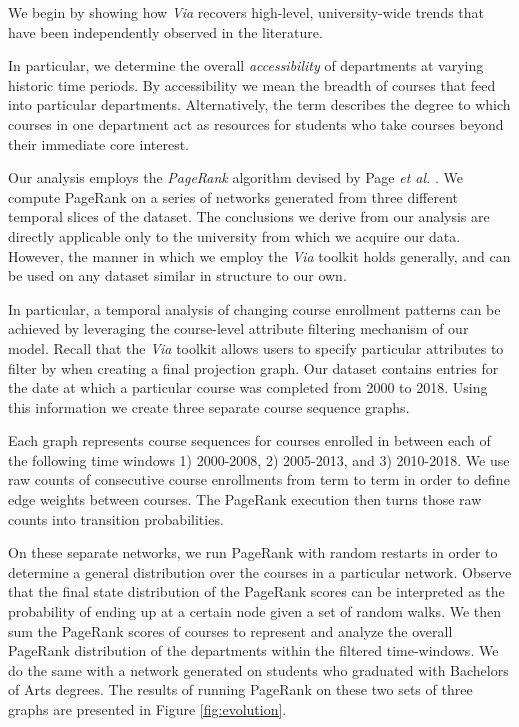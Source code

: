 \documentclass{sigchi}
\begin{document}
We begin by showing how {\em Via} recovers high-level, university-wide
trends that have been independently observed in the literature. 

In particular, we determine the overall {\em accessibility} of departments at varying historic time periods. By accessibility we mean the breadth of courses that feed into particular departments. Alternatively, the term describes the degree to which courses in one department act as resources for students who take courses beyond their immediate core interest.

Our analysis employs the {\em PageRank} algorithm devised by Page
\textit{et al.}  \cite{Page1999}. We compute PageRank on a series of
networks generated from three different temporal slices of the
dataset. The conclusions we derive from our analysis are directly
applicable only to the university from which we acquire our
data. However, the manner in which we employ the \textit{Via} toolkit
holds generally, and can be used on any dataset similar in structure
to our own.

In particular, a temporal analysis of changing course enrollment
patterns can be achieved by leveraging the course-level attribute
filtering mechanism of our model. Recall that the \textit{Via} toolkit
allows users to specify particular attributes to filter by when
creating a final projection graph. Our dataset contains entries for
the date at which a particular course was completed from 2000 to
2018. Using this information we create three separate course sequence
graphs.

Each graph represents course sequences for courses enrolled in between
each of the following time windows 1) 2000-2008, 2) 2005-2013, and 3)
2010-2018. We use raw counts of consecutive course enrollments from
term to term in order to define edge weights between courses. The
PageRank execution then turns those raw counts into transition
probabilities.

On these separate networks, we run PageRank with random restarts in
order to determine a general distribution over the courses in a
particular network. Observe that the final state distribution of the
PageRank scores can be interpreted as the probability of ending up at
a certain node given a set of random walks. We then sum the PageRank
scores of courses to represent and analyze the overall PageRank
distribution of the departments within the filtered time-windows. We
do the same with a network generated on students who graduated with
Bachelors of Arts degrees. The results of running PageRank on these
two sets of three graphs are presented in Figure \ref{fig:evolution}.
\end{document}

